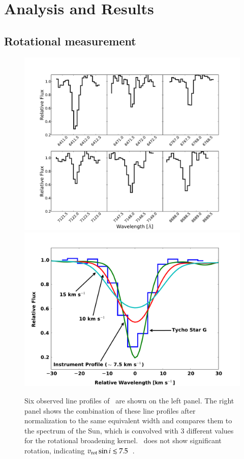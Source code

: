 \section{Analysis and Results}

\subsection{Rotational measurement}

\begin{figure}[p!]
\centering
\vspace{-5mm}
\includegraphics*[width=.95\textwidth, trim=0 0 2cm 0, clip]{chapter_sn1572_starg/plots/precombobj_sn1572.pdf}
\includegraphics*[width=.95\textwidth, trim=0 0 2cm 0, clip]{chapter_sn1572_starg/plots/rotcomp_subaru_starg.pdf}
\caption[Rotation of Tycho-G from HDS spectrum]{Six observed  line profiles of  \starg\ are shown on the left panel. The right panel shows the combination of these line profiles after normalization to the same equivalent width and compares them to the spectrum of the Sun, which is convolved with 3 different values for the rotational broadening kernel. \starg\ does not show significant rotation, indicating $v_{\rm{rot}} \sin{i} \lesssim 7.5$~\kms.}
\label{fig:sunobjrot}
\end{figure}

